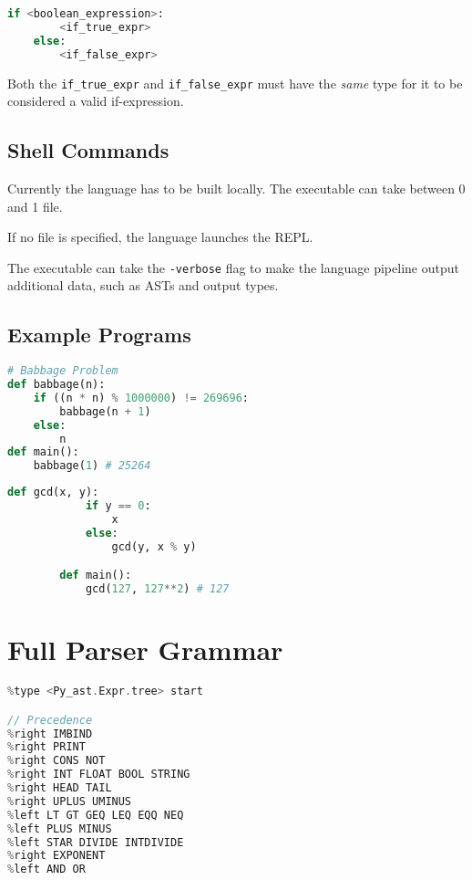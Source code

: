 \documentclass{l4proj}
\begin{document}
\begin{appendices}
\begin{lstlisting}[language=Python]
    if <boolean_expression>:
        <if_true_expr> 
    else:
        <if_false_expr>
\end{lstlisting}

Both the \texttt{if\_true\_expr} and \texttt{if\_false\_expr} must have the \emph{same} type for it to be considered a valid if-expression.

\subsection{Shell Commands}
Currently the language has to be built locally.
The executable can take between 0 and 1 file.

If no file is specified, the language launches the REPL.

The executable can take the \texttt{-verbose} flag to make the language pipeline output additional data, such as ASTs and output types.
\subsection{Example Programs}

\begin{lstlisting}[language=Python, label=lst:pyfunc-babbage, caption=Pyfunc solution to the Babbage problem.]
# Babbage Problem
def babbage(n):
    if ((n * n) % 1000000) != 269696:
        babbage(n + 1)
    else:
        n
def main():
    babbage(1) # 25264
        \end{lstlisting}

        \begin{lstlisting}[language=Python, label=lst:pyfunc-gcd, caption=Pyfunc greatest common divisor example program.]
        def gcd(x, y):
            if y == 0:
                x
            else:
                gcd(y, x % y)

        def main():
            gcd(127, 127**2) # 127
    \end{lstlisting}
\section{Full Parser Grammar}

\begin{lstlisting}[language=C, label=lst:parser-spec, caption=PyFunc's full parser specification for Menhir.]
%start start
%type <Py_ast.Expr.tree> start

// Precedence
%right IMBIND
%right PRINT
%right CONS NOT
%right INT FLOAT BOOL STRING 
%right HEAD TAIL
%right UPLUS UMINUS
%left LT GT GEQ LEQ EQQ NEQ
%left PLUS MINUS
%left STAR DIVIDE INTDIVIDE
%right EXPONENT
%left AND OR


\end{lstlisting}
\end{appendices}
\end{document}
